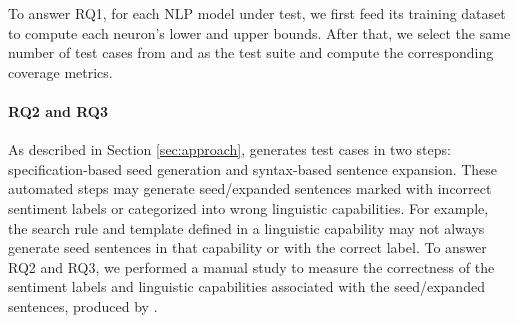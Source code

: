 To answer RQ1, for each NLP model under test, we first feed its training dataset to compute each neuron's lower and upper bounds. After that, we select the same number of test cases from \tool and \Cklst as the test suite and compute the corresponding coverage metrics. 


%
%

\paragraph{\textbf{RQ2 and RQ3}} As described in Section \ref{sec:approach},
\tool generates test cases in two steps: specification-based seed
generation and syntax-based sentence expansion. These automated steps
may generate seed/expanded sentences marked with incorrect sentiment
labels or categorized into wrong linguistic capabilities. For example,
the search rule and template defined in a linguistic capability may
not always generate seed sentences in that capability or with the
correct label.  To answer RQ2 and RQ3, we performed a manual study to
measure the correctness of the sentiment labels and linguistic
capabilities associated with the seed/expanded sentences, produced by
\tool.

